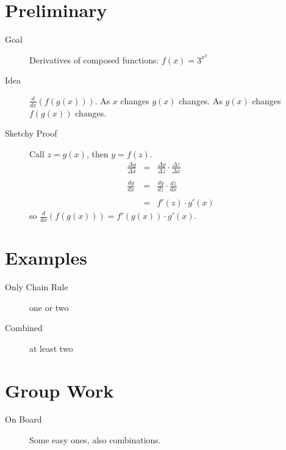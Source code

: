 \documentclass[11pt]{article}
\newcommand{\ds}{\displaystyle}
\begin{document}
\drawtitle

\section*{Preliminary}
\begin{description}
\item[Goal] Derivatives of composed functions: $f(x)=3^{x^2}$
\item[Idea] $\ds\frac{d}{dx}(f(g(x)))$.  As $x$ changes $g(x)$
  changes.  As $g(x)$ changes $f(g(x))$ changes.
\item[Sketchy Proof] Call $z=g(x)$, then $y=f(z)$.
  \[
  \begin{array}{rcl}
    \ds\frac{\Delta y}{\Delta x} &=&
    \ds\frac{\Delta y}{\Delta z}\cdot \frac{\Delta z}{\Delta x}\\
    \\
    \ds\frac{dy}{dx} &=&
    \ds\frac{dy}{dz}\cdot \frac{dz}{dx}\\
    \\
    &=& f'(z)\cdot g'(x)
  \end{array}
  \]
  so $\ds\frac{d}{dx}(f(g(x)))=f'(g(x))\cdot g'(x)$.
\end{description}

\section*{Examples}
\begin{description}
\item[Only Chain Rule] one or two
\item[Combined] at least two
\end{description}

\section*{Group Work}
\begin{description}
\item[On Board] Some easy ones, also combinations.
\end{description}
\end{document}
